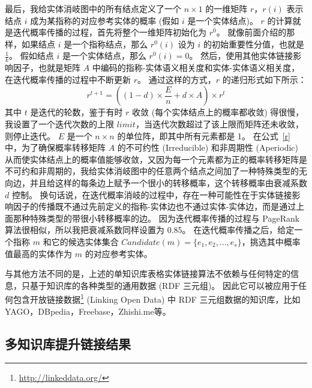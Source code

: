 最后，我给实体消岐图中的所有结点定义了一个 $n \times 1$ 的一维矩阵 $r$，$r(i)$ 表示结点 $i$ 成为某指称的对应参考实体的概率 (假如 $i$ 是一个实体结点)。
$r$ 的计算就是迭代概率传播的过程，首先将整个一维矩阵初始化为 $r^0$。
就像前面介绍的那样，如果结点 $i$ 是一个指称结点，那么 $r^0(i)$ 设为 $i$ 的初始重要性分值，也就是 $\frac{1}{k}$。
假如结点 $i$ 是一个实体结点，那么 $r^0(i)=0$。
然后，使用其他实体链接影响因子，也就是矩阵 $A$ 中编码的指称-实体语义相关度和实体-实体语义相关度，在迭代概率传播的过程中不断更新 $r$。
通过这样的方式，$r$ 的递归形式如下所示：
\begin{equation}
r^{t+1}=((1-d) \times \frac{E}{n} + d \times A) \times r^t
\label{r}
\end{equation}
其中 $t$ 是迭代的轮数，鉴于有时 $r$ 收敛 (每个实体结点上的概率都收敛) 得很慢，我设置了一个迭代次数的上限 $limit$，当迭代次数超过了该上限而矩阵还未收敛，则停止迭代。
$E$ 是一个 $n \times n$ 的单位阵，即其中所有元素都是 1。
在公式~\ref{r} 中，为了确保概率转移矩阵 $A$ 的不可约性 (Irreducible) 和非周期性 (Aperiodic) 从而使实体结点上的概率值能够收敛，又因为每一个元素都为正的概率转移矩阵是不可约和非周期的\cite{tauchen1986finite}，我给实体消岐图中的任意两个结点之间加了一种特殊类型的无向边，并且给这样的每条边上赋予一个很小的转移概率，这个转移概率由衰减系数 $d$ 控制。
换句话说，在迭代概率消岐的过程中，存在一种可能性在于实体链接影响因子的传播既不通过先前定义的指称-实体边也不通过实体-实体边，而是通过上面那种特殊类型的带很小转移概率的边。
因为迭代概率传播的过程与 PageRank\cite{page1999pagerank} 算法很相似，所以我把衰减系数同样设置为 0.85。
在迭代概率传播之后，给定一个指称 $m$ 和它的候选实体集合 $Candidate(m)=\{e_1, e_2, ..., e_s\}$，挑选其中概率值最高的实体作为 $m$ 的对应参考实体。\par

与其他方法不同的是，上述的单知识库表格实体链接算法不依赖与任何特定的信息，只基于知识库的各种类型的通用数据 (RDF 三元组)。
因此它可以被应用于任何包含开放链接数据\footnote{\url{http://linkeddata.org/}} (Linking Open Data) 中 RDF 三元组数据的知识库，比如 YAGO\cite{suchanek2007yago}，DBpedia\cite{auer2007dbpedia}，Freebase\cite{bollacker2008freebase}，Zhishi.me\cite{niu2011zhishi}等。


\subsection{多知识库提升链接结果}\label{multiple}

